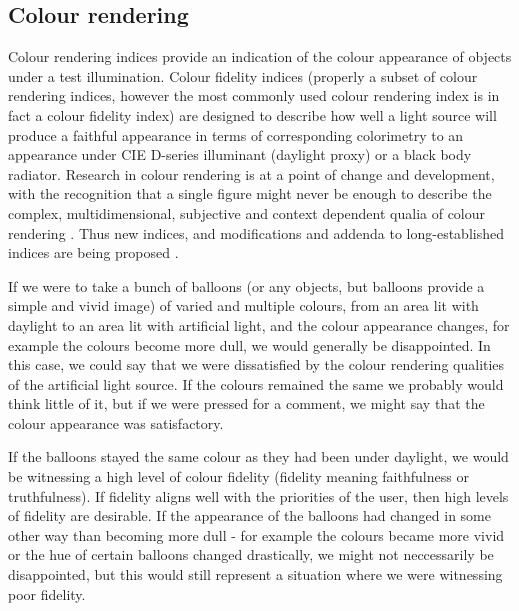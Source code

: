 \subsection{Colour rendering}

Colour rendering indices provide an indication of the colour appearance of objects under a test illumination. Colour fidelity indices (properly a subset of colour rendering indices, however the most commonly used colour rendering index is in fact a colour fidelity index) are designed to describe how well a light source will produce a faithful appearance in terms of corresponding colorimetry to an appearance under \gls{CIE} D-series illuminant (daylight proxy) or a black body radiator. %
Research in colour rendering is at a point of change and development, with the recognition that a single figure might never be enough to describe the complex, multidimensional, subjective and context dependent qualia of colour rendering \citep{rea_color_2008}. Thus new indices, and modifications and addenda to long-established indices are being proposed \citep{smet_memory_2012,davis_color_2010,rea_practical_2010,ies_ies_2015,teunissen_characterising_2016}.

If we were to take a bunch of balloons (or any objects, but balloons provide a simple and vivid image) of varied and multiple colours, from an area lit with daylight to an area lit with artificial light, and the colour appearance changes, for example the colours become more dull, we would generally be disappointed. In this case, we could say that we were dissatisfied by the colour rendering qualities of the artificial light source. If the colours remained the same we probably would think little of it, but if we were pressed for a comment, we might say that the colour appearance was satisfactory. 

If the balloons stayed the same colour as they had been under daylight, we would be witnessing a high level of colour fidelity (fidelity meaning faithfulness or truthfulness). If fidelity aligns well with the priorities of the user, then high levels of fidelity are desirable. If the appearance of the balloons had changed in some other way than becoming more dull - for example the colours became more vivid or the hue of certain balloons changed drastically, we might not neccessarily be disappointed, but this would still represent a situation where we were witnessing poor fidelity.

